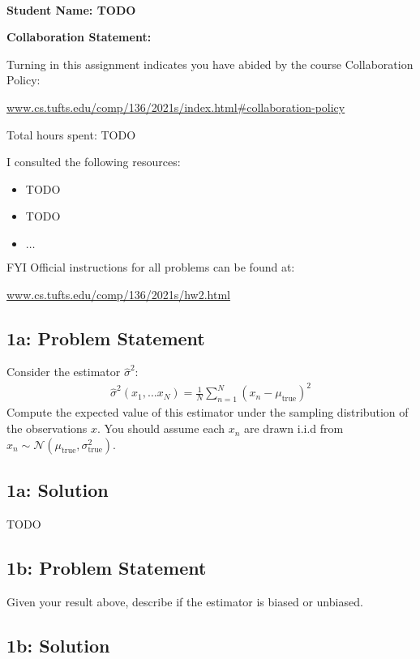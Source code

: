 \documentclass[12pt]{article}
\newcommand{\officialdirections}[1]{{\color{blue} #1}}
\begin{document}
~~\\ %

{\Large{\bf Student Name: TODO}}

{\Large{\bf Collaboration Statement:}}

Turning in this assignment indicates you have abided by the course Collaboration Policy:

\url{www.cs.tufts.edu/comp/136/2021s/index.html#collaboration-policy}

Total hours spent: TODO

I consulted the following resources:
\begin{itemize}
\item TODO
\item TODO
\item $\ldots$	
\end{itemize}

FYI Official instructions for all problems can be found at:

\url{www.cs.tufts.edu/comp/136/2021s/hw2.html}


\tableofcontents

\newpage
\officialdirections{
\subsection*{1a: Problem Statement}

Consider the estimator $\hat{\sigma}^2$:
\begin{align}
\hat{\sigma}^2(x_1, \ldots x_N) = \frac{1}{N} \sum_{n=1}^N (x_n - \mu_{\text{true}})^2
\end{align}
Compute the expected value of this estimator under the sampling distribution of the observations $x$. You should assume each $x_n$ are drawn i.i.d from $x_n \sim \mathcal{N}( \mu_{\text{true}}, \sigma^2_{\text{true}})$.  
}

\subsection{1a: Solution}

TODO


\newpage
\officialdirections{
\subsection*{1b: Problem Statement}
Given your result above, describe if the estimator is biased or unbiased.
}

\subsection{1b: Solution}
\end{document}
